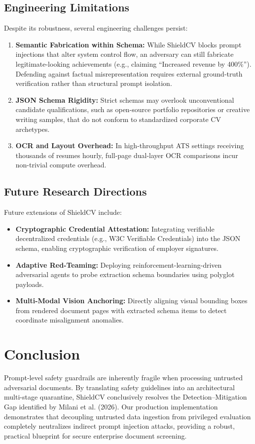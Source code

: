 \documentclass[10pt,twocolumn]{article}
\begin{document}
\subsection{Engineering Limitations}
Despite its robustness, several engineering challenges persist:
\begin{enumerate}
    \item \textbf{Semantic Fabrication within Schema:} While ShieldCV blocks prompt injections that alter system control flow, an adversary can still fabricate legitimate-looking achievements (e.g., claiming ``Increased revenue by 400\%''). Defending against factual misrepresentation requires external ground-truth verification rather than structural prompt isolation.
    \item \textbf{JSON Schema Rigidity:} Strict schemas may overlook unconventional candidate qualifications, such as open-source portfolio repositories or creative writing samples, that do not conform to standardized corporate CV archetypes.
    \item \textbf{OCR and Layout Overhead:} In high-throughput ATS settings receiving thousands of resumes hourly, full-page dual-layer OCR comparisons incur non-trivial compute overhead.
\end{enumerate}

\subsection{Future Research Directions}
Future extensions of ShieldCV include:
\begin{itemize}
    \item \textbf{Cryptographic Credential Attestation:} Integrating verifiable decentralized credentials (e.g., W3C Verifiable Credentials) into the JSON schema, enabling cryptographic verification of employer signatures.
    \item \textbf{Adaptive Red-Teaming:} Deploying reinforcement-learning-driven adversarial agents to probe extraction schema boundaries using polyglot payloads.
    \item \textbf{Multi-Modal Vision Anchoring:} Directly aligning visual bounding boxes from rendered document pages with extracted schema items to detect coordinate misalignment anomalies.
\end{itemize}

\section{Conclusion}
\label{sec:conclusion}
Prompt-level safety guardrails are inherently fragile when processing untrusted adversarial documents. By translating safety guidelines into an architectural multi-stage quarantine, ShieldCV conclusively resolves the Detection--Mitigation Gap identified by Milani et al. (2026). Our production implementation demonstrates that decoupling untrusted data ingestion from privileged evaluation completely neutralizes indirect prompt injection attacks, providing a robust, practical blueprint for secure enterprise document screening.
\end{document}
